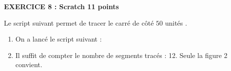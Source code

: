 \textbf{EXERCICE 8 : Scratch \hfill 11 points}

\medskip


Le script suivant permet de tracer le carré de côté $50$ unités .

\begin{center}
\begin{scratch}
{
}
\end{scratch}
\end{center}

\medskip

\begin{enumerate}
\item %

\medskip

On a lancé le script suivant :

\begin{center}
\begin{scratch}
{
}
\end{scratch}
\end{center}
\item %
Il suffit de compter le nombre de segments tracés : 12. Seule la figure 2 convient.
\end{enumerate}



